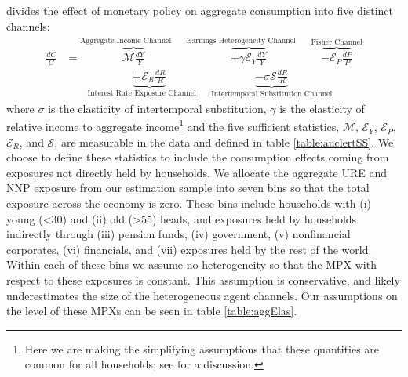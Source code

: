 \documentclass[titlepage]{\econtex}\newcommand{\texname}{ConsumptionHeterogeneity}
\begin{document}
\cite{auclert_monetary_2017} divides the effect of monetary policy on aggregate consumption into five distinct channels:
\begingroup
\allowdisplaybreaks[0]
\begin{align} 
\frac{dC}{C} &= \overbrace{\mathcal{M}\frac{dY}{Y}}^{\text{Aggregate Income Channel}\qquad} \overbrace{ + \gamma \mathcal{E}_Y \frac{dY}{Y}}^{\text{Earnings Heterogeneity Channel}\qquad} \overbrace{ - \mathcal{E}_P\frac{dP}{P}}^{\text{Fisher Channel}}  \nonumber \\
& \qquad \underbrace{ + \mathcal{E}_R \frac{dR}{R}}_{\text{Interest Rate Exposure Channel}\qquad}  \underbrace{ - \sigma \mathcal{S}\frac{dR}{R}}_{\text{Intertemporal Substitution Channel}} \label{auclert_channels}
\end{align}
\endgroup
where $\sigma$ is the elasticity of intertemporal substitution, $\gamma$ is the elasticity of relative income to aggregate income\footnote{Here we are making the simplifying assumptions that these quantities are common for all households; see \cite{auclert_monetary_2017} for a discussion.} and the five sufficient statistics, $\mathcal{M}$, $\mathcal{E}_Y$, $\mathcal{E}_P$, $\mathcal{E}_R$, and $\mathcal{S}$, are measurable in the data and defined in table \ref{table:auclertSS}. We choose to define these statistics to include the consumption effects coming from exposures not directly held by households. We allocate the aggregate URE and NNP exposure from our estimation sample into seven bins so that the total exposure across the economy is zero. These bins include households with (i) young (<30) and (ii) old (>55) heads, and exposures held by households indirectly through (iii) pension funds, (iv) government, (v) nonfinancial corporates, (vi) financials, and (vii) exposures held by the rest of the world. Within each of these bins we assume no heterogeneity so that the MPX with respect to these exposures is constant. This assumption is conservative, and likely underestimates the size of the heterogeneous agent channels. Our assumptions on the level of these MPXs can be seen in table \ref{table:aggElas}.
\end{document}
